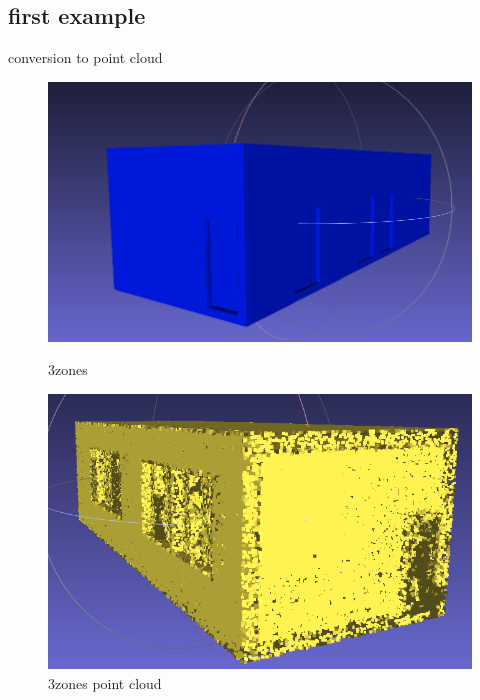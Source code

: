 \documentclass[10pt]{beamer}
\begin{document}
\subsection*{first example}
\begin{frame}{conversion to point cloud}
    \begin{figure}[H]
        \centering
        \begin{minipage}[t]{0.35\textwidth}
          \includegraphics[width=\textwidth]{../../images/screen_kinetic/3zones.png}
          \caption*{3zones}
        \end{minipage}
        \begin{minipage}[t]{0.35\textwidth}
            \includegraphics[width=\textwidth]{../../images/screen_kinetic/3zones_point_cloud.png}
            \caption*{3zones point cloud}
          \end{minipage}
      \end{figure}  
\end{frame}
\end{document}
